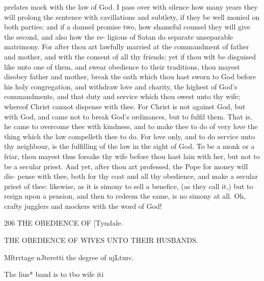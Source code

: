 \documentclass{custom}
\begin{document}
prelates mock with the law of God. I pass over with 
silence how many years they will prolong the sentence 
with cavillations and subtlety, if they be well monied on
both parties; and if a damsel promise two, how shameful
counsel they will give the second, and also how the re-
ligious of Satan do separate unseparable matrimony. For
after thou art lawfully married at the commandment of 
father and mother, and with the consent of all thy friends;
yet if thou wilt be disguised like unto one of them, and
swear obedience to their traditions, thou mayest disobey
father and mother, break the oath which thou hast sworn
to God before his holy congregation, and withdraw love
and charity, the highest of God's commandments, and 
that duty and service which thou owest unto thy wife;
whereof Christ cannot dispense with thee. For Christ is 
not against God, but with God, and came not to break 
God's ordinances, but to fulfil them. That is, he came 
to overcome thee with kindness, and to make thee to do of 
very love the thing which the law compelleth thee to do. 
For love only, and to do service unto thy neighbour, is the 
fulfilling of the law in the sight of God. To be a monk 
or a friar, thou mayest thus forsake thy wife before thou 
hast lain with her, but not to be a secular priest. And
yet, after thou art professed, the Pope for money will dis-
pense with thee, both for thy coat and all thy obedience,
and make a secular priest of thee: likewise, as it is 
simony to sell a benefice, (as they call it,) but to resign 
upon a pension, and then to redeem the same, is no simony 
at all. Oh, crafty jugglers and mockers with the word
of God! 


206 
THE OBEDIENCE OF 
[Tyndale.

THE OBEDIENCE OF WIVES UNTO THEIR
HUSBANDS.

Mftrrtage 
nJteretti 
the degree 
of njLturc. 

The lius* 
band is to 
tbo wife iti 
\end{document}
